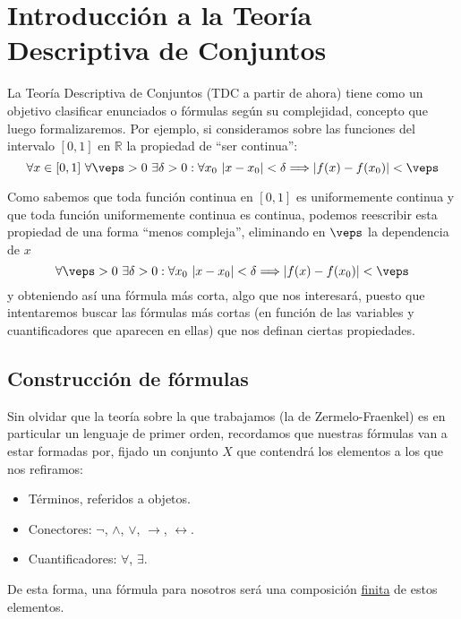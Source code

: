 \chapter{Introducción a la Teoría Descriptiva de Conjuntos}

La Teoría Descriptiva de Conjuntos (TDC a partir de ahora) tiene como un objetivo clasificar enunciados o fórmulas según su complejidad, concepto que luego formalizaremos. Por ejemplo, si consideramos sobre las funciones del intervalo $[0,1]$ en $\mathbb{R}$ la propiedad de ``ser continua'':
\begin{equation*}
    \forall x\in [0,1]\ \forall \veps > 0\ \exists \delta>0 : \forall x_0\ |x-x_0|<\delta \Longrightarrow |f(x)-f(x_0)|<\veps
\end{equation*}

Como sabemos que toda función continua en $[0,1]$ es uniformemente continua y que toda función uniformemente continua es continua, podemos reescribir esta propiedad de una forma ``menos compleja'', eliminando en $\veps$ la dependencia de $x$
\begin{equation*}
    \forall \veps > 0\ \exists \delta>0 : \forall x_0\ |x-x_0|<\delta \Longrightarrow |f(x)-f(x_0)|<\veps
\end{equation*}
y obteniendo así una fórmula más corta, algo que nos interesará, puesto que intentaremos buscar las fórmulas más cortas (en función de las variables y cuantificadores que aparecen en ellas) que nos definan ciertas propiedades.

\section{Construcción de fórmulas}
Sin olvidar que la teoría sobre la que trabajamos (la de Zermelo-Fraenkel) es en particular un lenguaje de primer orden, recordamos que nuestras fórmulas van a estar formadas por, fijado un conjunto $X$ que contendrá los elementos a los que nos refiramos:
\begin{itemize}
    \item Términos, referidos a objetos.
    \item Conectores: $\lnot$, $\land$, $\lor$, $\rightarrow$, $\leftrightarrow $.
    \item Cuantificadores: $\forall $, $\exists $.
\end{itemize}
De esta forma, una fórmula para nosotros será una composición \underline{finita} de estos elementos.\\

